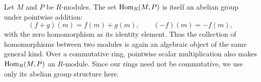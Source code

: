 \documentclass[Notebook.tex]{subfiles}
\begin{document}
%
%
%
%


Let $M$ and $P$ be $R$-modules. The set $\operatorname{Hom}_R(M,P)$ is itself an abelian group under pointwise addition:
\[
(f+g)(m)=f(m)+g(m),\qquad (-f)(m)=-f(m),
\]
with the zero homomorphism as its identity element. Thus the collection of homomorphisms between two modules is again an algebraic object of the same general kind. Over a commutative ring, pointwise scalar multiplication also makes $\operatorname{Hom}_R(M,P)$ an $R$-module. Since our rings need not be commutative, we use only its abelian group structure here.
\end{document}
